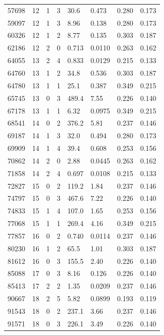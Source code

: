 \documentclass[preview]{standalone}
\begin{document}
{{{\begin{tabular}{L{1.2cm}C{1.2cm} C{0.3cm}C{0.5cm} C{1.4cm}C{1.4cm} C{1.4cm}C{1.4cm}}
  57698  &    12  & 1     &  3 &  30.6  & 0.473  & 0.280 &  0.173   \\ 
  59097  &    12  & 1     &  3 &  8.96  & 0.138  & 0.280 &  0.173   \\ 
  60326  &    12  & 1     &  2 &  8.77  & 0.135  & 0.303 &  0.187   \\ 
  62186  &    12  & 2     &  0 &  0.713  & 0.0110  & 0.263 &  0.162   \\ 
  64055  &    13  & 2     &  4 &  0.833  & 0.0129  & 0.215 &  0.133   \\ 
  64760  &    13  & 1     &  2 &  34.8  & 0.536  & 0.303 &  0.187   \\ 
  64780  &    13  & 1     &  1 &  25.1  & 0.387  & 0.349 &  0.215   \\ 
  65745  &    13  & 0     &  3 &  489.4  & 7.55  & 0.226 &  0.140   \\ 
  67178  &    13  & 1     &  1 &  6.32  & 0.0975  & 0.349 &  0.215   \\ 
  68541  &    14  & 0     &  2 &  376.2  & 5.81  & 0.237 &  0.146   \\ 
  69187  &    14  & 1     &  3 &  32.0  & 0.494  & 0.280 &  0.173   \\ 
  69909  &    14  & 1     &  4 &  39.4  & 0.608  & 0.253 &  0.156   \\ 
  70862  &    14  & 2     &  0 &  2.88  & 0.0445  & 0.263 &  0.162   \\ 
  71858  &    14  & 2     &  4 &  0.697  & 0.0108  & 0.215 &  0.133   \\ 
  72827  &    15  & 0     &  2 &  119.2  & 1.84  & 0.237 &  0.146   \\ 
  74797  &    15  & 0     &  3 &  467.6  & 7.22  & 0.226 &  0.140   \\ 
  74833  &    15  & 1     &  4 &  107.0  & 1.65  & 0.253 &  0.156   \\ 
  77068  &    15  & 1     &  1 &  269.4  & 4.16  & 0.349 &  0.215   \\ 
  77857  &    16  & 0     &  2 &  0.740  & 0.0114  & 0.237 &  0.146   \\ 
  80230  &    16  & 1     &  2 &  65.5  & 1.01  & 0.303 &  0.187   \\ 
  81612  &    16  & 0     &  3 &  155.5  & 2.40  & 0.226 &  0.140   \\ 
  85088  &    17  & 0     &  3 &  8.16  & 0.126  & 0.226 &  0.140   \\ 
  85413  &    17  & 2     &  2 &  1.35  & 0.0209  & 0.237 &  0.146   \\ 
  90667  &    18  & 2     &  5 &  5.82  & 0.0899  & 0.193 &  0.119   \\ 
  91543  &    18  & 0     &  2 &  237.1  & 3.66  & 0.237 &  0.146   \\ 
  91571  &    18  & 0     &  3 &  226.1  & 3.49  & 0.226 &  0.140   \\ 
\hline 
\end{tabular} 

}}}
\end{document}
